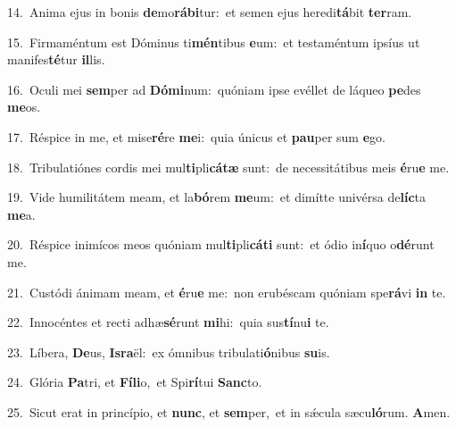 {\numbfont\textcolor{\numbcolor}{14.}}~Anima ejus in bonis \textbf{de}\-mo\-\textbf{rá}\-\textbf{bi}tur:~\star et semen ejus heredi\-\textbf{tá}\-bit \textbf{ter}\-ram.\par
{\numbfont\textcolor{\numbcolor}{15.}}~Firmaméntum est Dóminus ti\-\textbf{mén}\-tibus \textbf{e}\-um:~\star et testaméntum ipsíus ut manifes\-\textbf{té}\-tur \textbf{il}\-lis.\par
{\numbfont\textcolor{\numbcolor}{16.}}~Oculi mei \textbf{sem}\-per ad \textbf{Dó}\-\textbf{mi}num:~\star quóniam ipse evéllet de láqueo \textbf{pe}\-des \textbf{me}\-os.\par
{\numbfont\textcolor{\numbcolor}{17.}}~Réspice in me, et mise\-\textbf{ré}\-re \textbf{me}\-i:~\star quia únicus et \textbf{pau}\-per sum \textbf{e}\-go.\par
{\numbfont\textcolor{\numbcolor}{18.}}~Tribulatiónes cordis mei mul\-\textbf{ti}\-pli\-\textbf{cá}\-\textbf{tæ} sunt:~\star de necessitátibus meis \textbf{é}\-ru\textbf{e} me.\par
{\numbfont\textcolor{\numbcolor}{19.}}~Vide humilitátem meam, et la\-\textbf{bó}\-rem \textbf{me}\-um:~\star et dimítte univérsa de\-\textbf{líc}\-ta \textbf{me}\-a.\par
{\numbfont\textcolor{\numbcolor}{20.}}~Réspice inimícos meos quóniam mul\-\textbf{ti}\-pli\-\textbf{cá}\-\textbf{ti} sunt:~\star et ódio in\-\textbf{í}\-quo o\-\textbf{dé}\-runt me.\par
{\numbfont\textcolor{\numbcolor}{21.}}~Custódi ánimam meam, et \textbf{é}\-ru\textbf{e} me:~\star non erubéscam quóniam spe\-\textbf{rá}\-vi \textbf{in} te.\par
{\numbfont\textcolor{\numbcolor}{22.}}~Innocéntes et recti adhæ\-\textbf{sé}\-runt \textbf{mi}\-hi:~\star quia sus\-\textbf{tí}\-nu\textbf{i} te.\par
{\numbfont\textcolor{\numbcolor}{23.}}~Líbera, \textbf{De}\-us, \textbf{Is}\-\textbf{ra}ël:~\star ex ómnibus tribulati\-\textbf{ó}\-nibus \textbf{su}\-is.\par
{\numbfont\textcolor{\numbcolor}{24.}}~Glória \textbf{Pa}\-tri, et \textbf{Fí}\-\textbf{li}o,~\star et Spi\-\textbf{rí}\-tui \textbf{Sanc}\-to.\par
{\numbfont\textcolor{\numbcolor}{25.}}~Sicut erat in princípio, et \textbf{nunc}\-, et \textbf{sem}\-per,~\star et in sǽcula sæcu\-\textbf{ló}\-rum. \textbf{A}\-men.\par

